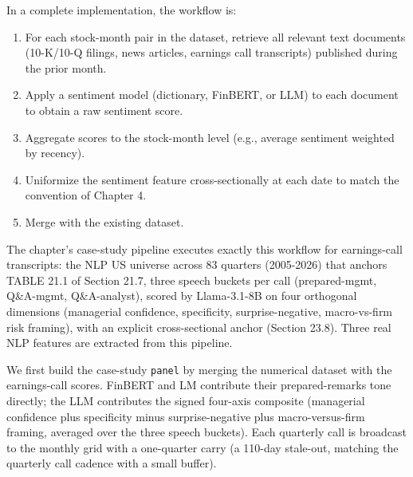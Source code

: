 In a complete implementation, the workflow is:

\begin{enumerate}
\item For each stock-month pair in the dataset, retrieve all relevant text documents (10-K/10-Q filings, news articles, earnings call transcripts) published during the prior month.
\item Apply a sentiment model (dictionary, FinBERT, or LLM) to each document to obtain a raw sentiment score.
\item Aggregate scores to the stock-month level (e.g., average sentiment weighted by recency).
\item Uniformize the sentiment feature cross-sectionally at each date to match the convention of Chapter 4.
\item Merge with the existing dataset.
\end{enumerate}

The chapter's case-study pipeline executes exactly this workflow for earnings-call transcripts: the NLP US universe across 83 quarters (2005-2026) that anchors TABLE 21.1 of Section 21.7, three speech buckets per call (prepared-mgmt, Q\&A-mgmt, Q\&A-analyst), scored by Llama-3.1-8B on four orthogonal dimensions (managerial confidence, specificity, surprise-negative, macro-vs-firm risk framing), with an explicit cross-sectional anchor (Section 23.8). Three real NLP features are extracted from this pipeline.

We first build the case-study \texttt{panel} by merging the numerical dataset with the earnings-call scores. FinBERT and LM contribute their prepared-remarks tone directly; the LLM contributes the signed four-axis composite (managerial confidence plus specificity minus surprise-negative plus macro-versus-firm framing, averaged over the three speech buckets). Each quarterly call is broadcast to the monthly grid with a one-quarter carry (a 110-day stale-out, matching the quarterly call cadence with a small buffer).

